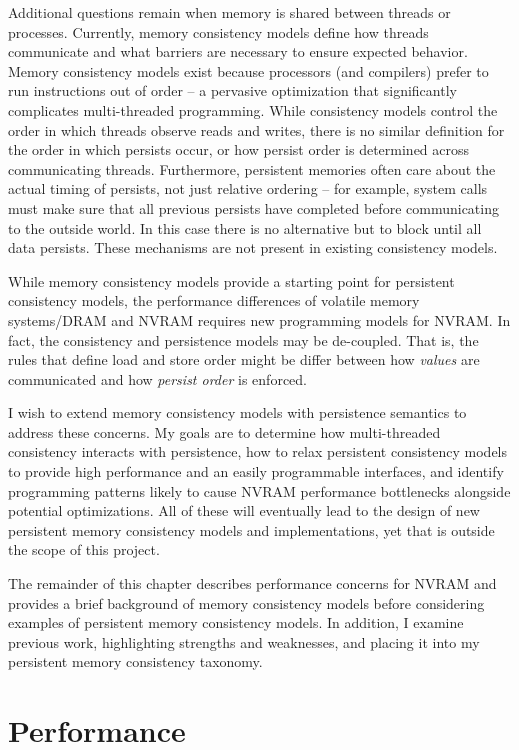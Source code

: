 Additional questions remain when memory is shared between threads or processes.
Currently, memory consistency models define how threads communicate and what barriers are necessary to ensure expected behavior.
Memory consistency models exist because processors (and compilers) prefer to run instructions out of order -- a pervasive optimization that significantly complicates multi-threaded programming.
While consistency models control the order in which threads observe reads and writes, there is no similar definition for the order in which persists occur, or how persist order is determined across communicating threads.
Furthermore, persistent memories often care about the actual timing of persists, not just relative ordering -- for example, system calls must make sure that all previous persists have completed before communicating to the outside world.
In this case there is no alternative but to block until all data persists.
These mechanisms are not present in existing consistency models.

While memory consistency models provide a starting point for persistent consistency models, the performance differences of volatile memory systems/DRAM and NVRAM requires new programming models for NVRAM.
In fact, the consistency and persistence models may be de-coupled.
That is, the rules that define load and store order might be differ between how \emph{values} are communicated and how \emph{persist order} is enforced.

I wish to extend memory consistency models with persistence semantics to address these concerns.
My goals are to determine how multi-threaded consistency interacts with persistence, how to relax persistent consistency models to provide high performance and an easily programmable interfaces, and identify programming patterns likely to cause NVRAM performance bottlenecks alongside potential optimizations.
All of these will eventually lead to the design of new persistent memory consistency models and implementations, yet that is outside the scope of this project.

The remainder of this chapter describes performance concerns for NVRAM and provides a brief background of memory consistency models before considering examples of persistent memory consistency models.
In addition, I examine previous work, highlighting strengths and weaknesses, and placing it into my persistent memory consistency taxonomy.

\section{Performance}
\label{sec:PMC:Performance}

